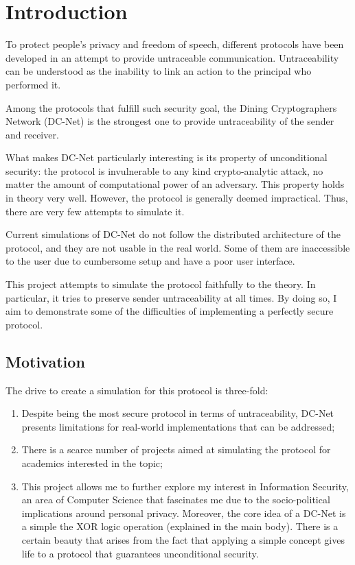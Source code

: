 \chapter{Introduction}


To protect people's privacy and freedom of speech, different protocols have been developed in an attempt to provide untraceable communication. Untraceability can be understood as the inability to link an action to the principal who performed it.


Among the protocols that fulfill such security goal, the Dining Cryptographers Network (DC-Net) is the strongest one to provide untraceability of the sender and receiver. 

What makes DC-Net particularly interesting is its property of unconditional security: the protocol is invulnerable to any kind crypto-analytic attack, no matter the amount of computational power of an adversary. This property holds in theory very well. However, the protocol is generally deemed impractical. Thus, there are very few attempts to simulate it.

Current simulations of DC-Net do not follow the distributed architecture of the protocol, and they are not usable in the real world. Some of them are inaccessible to the user due to cumbersome setup and have a poor user interface.

This project attempts to simulate the protocol faithfully to the theory. In particular, it tries to preserve sender untraceability at all times. By doing so, I aim to demonstrate some of the difficulties of implementing a perfectly secure protocol.

\section{Motivation}
The drive to create a simulation for this protocol is three-fold: 

\begin{enumerate}
\item Despite being the most secure protocol in terms of untraceability, DC-Net presents limitations for real-world implementations that can be addressed;

\item There is a scarce number of projects aimed at simulating the protocol for academics interested in the topic;

\item This project allows me to further explore my interest in Information Security, an area of Computer Science that fascinates me due to the socio-political implications around personal privacy. Moreover, the core idea of a DC-Net is a simple the XOR logic operation (explained in the main body). There is a certain beauty that arises from the fact that applying a simple concept gives life to a protocol that guarantees unconditional security.
\end{enumerate}



